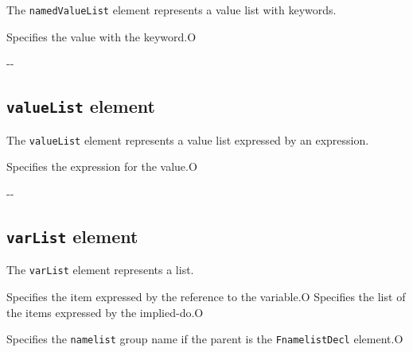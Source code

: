 The {\tt namedValueList} element represents a value list with keywords.


\begin{XcodeMLChildElements}
{Specifies the value with the keyword.}{O}
\end{XcodeMLChildElements}

\begin{XcodeMLAttributes}
\XcodeMLAttrDef{-}{-}
{-}{-}
\end{XcodeMLAttributes}


\subsection{ {\tt valueList} element}

The {\tt valueList} element represents a value list expressed by an expression.


\begin{XcodeMLChildElements}
{Specifies the expression for the value.}{O}
\end{XcodeMLChildElements}

\begin{XcodeMLAttributes}
\XcodeMLAttrDef{-}{-}
{-}{-}
\end{XcodeMLAttributes}


\subsection{ {\tt varList} element}

The {\tt varList} element represents a list.


\begin{XcodeMLChildElements}
{Specifies the item expressed by the reference to the variable.}{O}
{Specifies the list of the items expressed by the implied-do.}{O}
\end{XcodeMLChildElements}

\begin{XcodeMLAttributes}
{Specifies the {\tt namelist} group name if the parent is the {\tt FnamelistDecl} element.}{O}
\end{XcodeMLAttributes}
